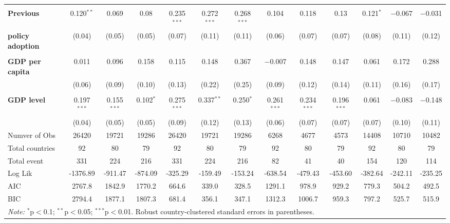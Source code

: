 \begin{table}[tb]
{\begin{tabular}{@{\extracolsep{5pt}}lcccccccccccc}
	&		&		&		&		&		&		&		&		&		&		&		&		\\
\textbf{Previous}	&	 0.120$^{**}$ 	&	0.069	&	0.08	&	 0.235$^{***}$ 	&	 0.272$^{***}$ 	&	 0.268$^{***}$ 	&	0.104	&	0.118	&	0.13	&	 0.121$^{*}$ 	&	 $-$0.067 	&	 $-$0.031  	\\
\textbf{policy adoption}	&	 (0.04)	&	 (0.05)	&	 (0.05)	&	 (0.07)	&	 (0.11)	&	 (0.11)	&	 (0.06)	&	 (0.07)	&	 (0.07)	&	 (0.08)	&	 (0.11)	&	 (0.12)	\\
	&		&		&		&		&		&		&		&		&		&		&		&		\\
\textbf{GDP per capita}	&	0.011	&	0.096	&	0.158	&	0.115	&	0.148	&	0.367	&	 $-$0.007 	&	0.148	&	0.147	&	0.061	&	0.172	&	0.288	\\
	&	 (0.06)	&	 (0.09)	&	 (0.10)	&	 (0.13)	&	 (0.22)	&	 (0.25)	&	 (0.09)	&	 (0.12)	&	 (0.14)	&	 (0.11)	&	 (0.16)	&	 (0.17)	\\
	&		&		&		&		&		&		&		&		&		&		&		&		\\
\textbf{GDP level}	&	 0.197$^{***}$ 	&	 0.155$^{***}$ 	&	 0.102$^{*}$ 	&	 0.275$^{***}$ 	&	 0.337$^{**}$ 	&	 0.250$^{*}$ 	&	 0.261$^{***}$ 	&	 0.234$^{***}$ 	&	 0.196$^{***}$ 	&	0.061	&	 $-$0.083 	&	 $-$0.148  	\\
	&	 (0.04)	&	 (0.05)	&	 (0.05)	&	 (0.09)	&	 (0.12)	&	 (0.13)	&	 (0.06)	&	 (0.07)	&	 (0.07)	&	 (0.07)	&	 (0.10)	&	 (0.11)	\\
\midrule																									
Numver of Obs	&	26420	&	19721	&	19286	&	26420	&	19721	&	19286	&	6268	&	4677	&	4573	&	14408	&	10710	&	10482	\\
Total countries	&	92	&	80	&	79	&	92	&	80	&	79	&	92	&	80	&	79	&	92	&	80	&	79	\\
Total event	&	331	&	224	&	216	&	331	&	224	&	216	&	82	&	41	&	40	&	154	&	120	&	114	\\
Log Lik	&	-1376.89	&	-911.47	&	-874.09	&	-325.29	&	-159.49	&	-153.24	&	-638.54	&	-479.43	&	-453.60	&	-382.64	&	-242.11	&	-235.25	\\
AIC	&	2767.8	&	1842.9	&	1770.2	&	664.6	&	339.0	&	328.5	&	1291.1	&	978.9	&	929.2	&	779.3	&	504.2	&	492.5	\\
BIC	&	2794.4	&	1877.1	&	1807.3	&	681.4	&	356.1	&	347.1	&	1312.3	&	1006.7	&	959.3	&	797.2	&	525.7	&	515.9	\\
\bottomrule																									
\multicolumn{13}{l}{\textit{Note:}  $^{*}$p$<$0.1; $^{**}$p$<$0.05; $^{***}$p$<$0.01.  Robust country-clustered standard errors in parentheses.} 																									\\
\end{tabular}%
}																									
\end{table}																									
